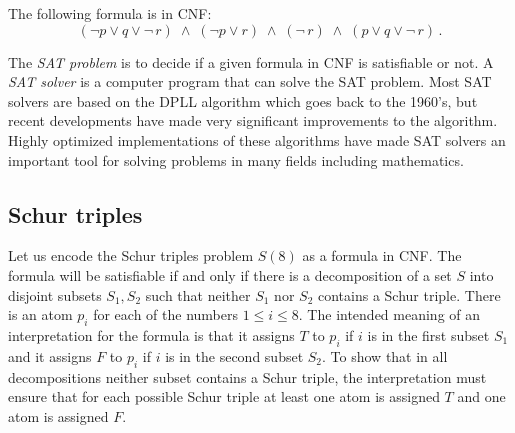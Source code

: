 The following formula is in CNF:
\[
(\neg p \vee q \vee \neg \,r) \;\wedge\; (\neg p \vee r)
\;\wedge\; (\neg \,r)\;\wedge\;(p \vee q \vee \neg \,r)\,.
\]

The \emph{SAT problem} is to decide if a given formula in CNF is satisfiable or not. A \emph{SAT solver} is a computer program that can solve the SAT problem. Most SAT solvers are based on the DPLL algorithm which goes back to the 1960's, but recent developments have made very significant improvements to the algorithm. Highly optimized implementations of these algorithms have made SAT solvers an important tool for solving problems in many fields including mathematics.

\subsection{Schur triples}

Let us encode the Schur triples problem $S(8)$ as a formula in CNF. The formula will be satisfiable if and only if there is a decomposition of a set $S$ into disjoint subsets $S_1,S_2$ such that neither $S_1$ nor $S_2$ contains a Schur triple. There is an atom $p_i$ for each of the numbers $1\leq i \leq 8$. The intended meaning of an interpretation for the formula is that it assigns $T$ to $p_i$ if $i$ is in the first subset $S_1$ and it assigns $F$ to $p_i$ if $i$ is in the second subset $S_2$. To show that in all decompositions neither subset contains a Schur triple, the interpretation must ensure that for each possible Schur triple at least one atom is assigned $T$ and one atom is assigned $F$. 

